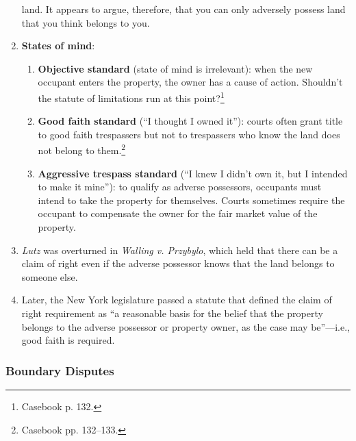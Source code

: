 \begin{enumerate}
    land. It appears to argue, therefore, that you can only adversely possess land 
    that you think belongs to you.
    \item \textbf{States of mind}:
    \begin{enumerate}
        \item \textbf{Objective standard} (state of mind is irrelevant): when 
        the new occupant enters the property, the owner has a cause of action. 
        Shouldn't the statute of limitations run at this 
        point?\footnote{Casebook p. 132.}
        \item \textbf{Good faith standard} (``I thought I owned it''): courts 
        often grant title to good faith trespassers but not to trespassers who 
        know the land does not belong to them.\footnote{Casebook pp. 132--133.}
        \item \textbf{Aggressive trespass standard} (``I knew I didn't own it, 
        but I intended to make it mine''): to qualify as adverse possessors, 
        occupants must intend to take the property for themselves. Courts 
        sometimes require the occupant to compensate the owner for the fair 
        market value of the property.
    \end{enumerate}
    \item \emph{Lutz} was overturned in \emph{Walling v. Przybylo}, which 
    held that there can be a claim of right even if the adverse possessor 
    knows that the land belongs to someone else.
    \item Later, the New York legislature passed a statute that defined the 
    claim of right requirement as ``a reasonable basis for the belief that the 
    property belongs to the adverse possessor or property owner, as the case 
    may be''---i.e., good faith is required.
\end{enumerate}

\subsubsection{Boundary Disputes}

